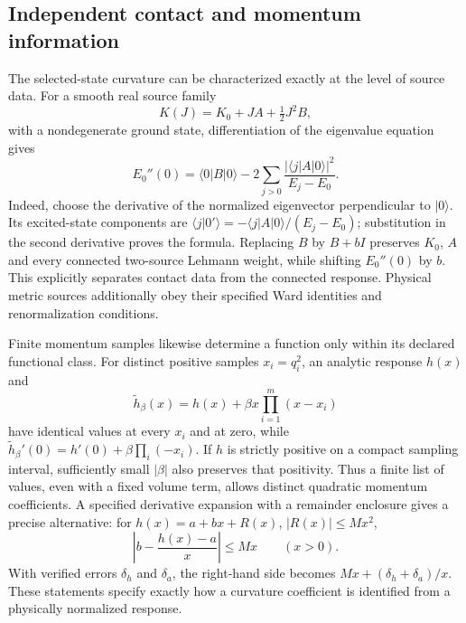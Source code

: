 \subsection{Independent contact and momentum information}
\label{sec:contact-independence}
The selected-state curvature can be characterized exactly at the level of source data. For a smooth real source family
\[
K(J)=K_0+JA+\tfrac12J^2B,
\]
with a nondegenerate ground state, differentiation of the eigenvalue equation gives
\begin{equation}\label{eq:source-curvature}
E_0''(0)=\langle0|B|0\rangle
-2\sum_{j>0}\frac{|\langle j|A|0\rangle|^2}{E_j-E_0}.
\end{equation}
Indeed, choose the derivative of the normalized eigenvector perpendicular to $|0\rangle$. Its excited-state components are $\langle j|0'\rangle=-\langle j|A|0\rangle/(E_j-E_0)$; substitution in the second derivative proves the formula. Replacing $B$ by $B+bI$ preserves $K_0$, $A$ and every connected two-source Lehmann weight, while shifting $E_0''(0)$ by $b$. This explicitly separates contact data from the connected response. Physical metric sources additionally obey their specified Ward identities and renormalization conditions.

Finite momentum samples likewise determine a function only within its declared functional class. For distinct positive samples $x_i=q_i^2$, an analytic response $h(x)$ and
\begin{equation}\label{eq:momentum-sample-family}
\widetilde h_\beta(x)=h(x)+\beta x\prod_{i=1}^m(x-x_i)
\end{equation}
have identical values at every $x_i$ and at zero, while
$\widetilde h_\beta'(0)=h'(0)+\beta\prod_i(-x_i)$.
If $h$ is strictly positive on a compact sampling interval, sufficiently small $|\beta|$ also preserves that positivity. Thus a finite list of values, even with a fixed volume term, allows distinct quadratic momentum coefficients. A specified derivative expansion with a remainder enclosure gives a precise alternative: for $h(x)=a+bx+R(x)$, $|R(x)|\leq Mx^2$,
\begin{equation}\label{eq:curvature-sample-bound}
\left|b-\frac{h(x)-a}{x}\right|\leq Mx\qquad(x>0).
\end{equation}
With verified errors $\delta_h$ and $\delta_a$, the right-hand side becomes $Mx+(\delta_h+\delta_a)/x$. These statements specify exactly how a curvature coefficient is identified from a physically normalized response.
